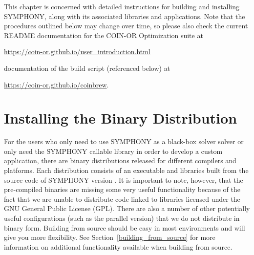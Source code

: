 
This chapter is concerned with detailed instructions for building and
installing SYMPHONY, along with its associated libraries and applications.
Note that the procedures outlined below may change over time, so please also
check the current README documentation for the COIN-OR Optimization suite at
\begin{center}
\url{https://coin-or.github.io/user_introduction.html}  
\end{center}

documentation of the  build script (referenced below) at
\begin{center}
\url{https://coin-or.github.io/coinbrew}.
\end{center}

\section{Installing the Binary Distribution}

For the users who only need to use SYMPHONY as a black-box solver solver or
only need the SYMPHONY callable library in order to develop a custom
application, there are binary distributions released for different compilers
and platforms. Each distribution consists of an executable and libraries built
from the source code of SYMPHONY version \VER. It is important to note,
however, that the pre-compiled binaries are missing some very useful
functionality because of the fact that we are unable to distribute code linked
to libraries licensed under the GNU General Public License (GPL). There are
also a number of other potentially useful configurations (such as the parallel
version) that we do not distribute in binary form. Building from source should
be easy in most environments and will give you more flexibility. See
Section~\ref{building_from_source} for more information on additional
functionality available when building from source.
 
